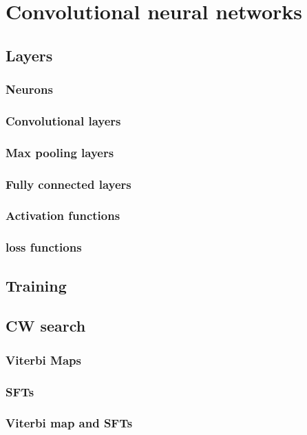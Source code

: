 \chapter{Convolutional neural networks}

\section{Layers}

\subsection{Neurons}

\subsection{Convolutional layers}

\subsection{Max pooling layers}

\subsection{Fully connected layers}

\subsection{Activation functions}

\subsection{loss functions}

\section{Training}

\section{CW search}

\subsection{Viterbi Maps}

\subsection{SFTs}

\subsection{Viterbi map and SFTs}